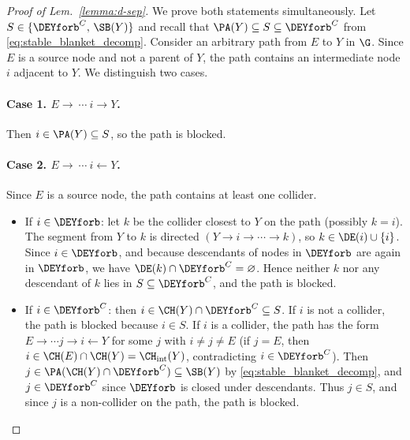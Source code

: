 \begin{proof}[Proof of Lem.~\ref{lemma:d-sep}]
We prove both statements simultaneously. Let
$S \in \{\DEYforb^C,\, \SB(Y)\}$ and recall that
$\PA(Y) \subseteq S \subseteq \DEYforb^C$ from \eqref{eq:stable_blanket_decomp}. Consider an arbitrary path from $E$
to $Y$ in $\G$. Since $E$ is a source node and not a parent of $Y$,
the path contains an intermediate node $i$ adjacent to $Y$. We
distinguish two cases.

\paragraph{Case 1. $E \rightarrow ~\cdots~ i \rightarrow Y$.}
Then $i \in \PA(Y) \subseteq S$, so the path is blocked.

\paragraph{Case 2. $E \rightarrow ~\cdots~ i \leftarrow Y$.}
Since $E$ is a source node, the path contains at least one collider.
\begin{itemize}
  \item If $i \in \DEYforb$: let $k$ be the collider closest to
    $Y$ on the path (possibly $k = i$). The segment from $Y$ to $k$ is
    directed $(Y \rightarrow i \rightarrow \cdots \rightarrow k)$, so $k \in \DE(i) \cup \{i\}$. Since
    $i \in \DEYforb$, and because descendants of nodes in
    $\DEYforb$ are again in $\DEYforb$, we have
    $\DE(k) \cap \DEYforb^C = \varnothing$. Hence neither $k$ nor any
    descendant of $k$ lies in $S \subseteq \DEYforb^C$, and the path
    is blocked.
  \item If $i \in \DEYforb^C$: then
    $i \in \CH(Y) \cap \DEYforb^C \subseteq S$. If $i$ is not a
    collider, the path is blocked because $i \in S$. If $i$ is a
    collider, the path has the form
    $E \to \cdots j \to i \leftarrow Y$ for some $j$ with $i \neq j \neq E$ (if
    $j = E$, then $i \in \CH(E) \cap \CH(Y) = \CH_\mathrm{int}(Y)$,
    contradicting $i \in \DEYforb^C$). Then
    $j \in \PA(\CH(Y) \cap \DEYforb^C) \subseteq \SB(Y)$ by
    \eqref{eq:stable_blanket_decomp}, and $j \in \DEYforb^C$ since
    $\DEYforb$ is closed under descendants. Thus $j \in S$, and since
    $j$ is a non-collider on the path, the path is blocked.
\end{itemize}
\end{proof}


